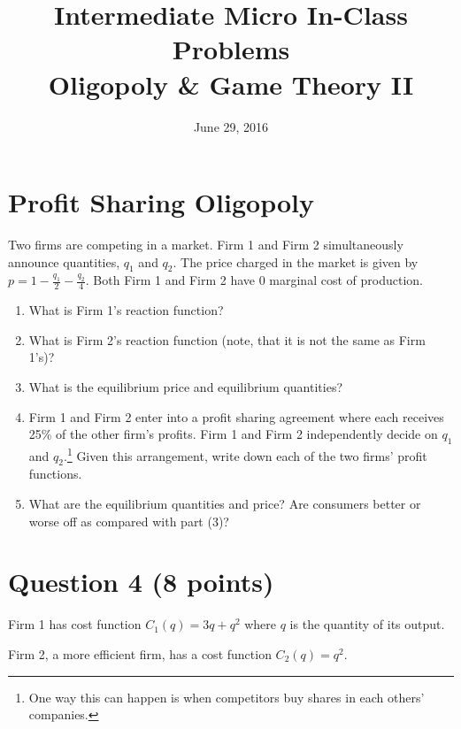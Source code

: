 \documentclass{article}
\begin{document}
\title{Intermediate Micro In-Class Problems \\ \large Oligopoly \& Game Theory II}

\date{June 29, 2016}

\maketitle

\section*{Profit Sharing Oligopoly}
Two firms are competing in a market. Firm 1 and Firm 2 simultaneously announce quantities, $q_{1}$ and $q_{2}$. The price charged in the market is given by $p = 1- \frac{q_{1}}{2} - \frac{q_{2}}{4}$. Both Firm 1 and Firm 2 have 0 marginal cost of production.

\begin{enumerate}
\item What is Firm 1's reaction function?
\item What is Firm 2's reaction function (note, that it is not the same as Firm 1's)?
\item What is the equilibrium price and equilibrium quantities?
\item Firm 1 and Firm 2 enter into a profit sharing agreement where each receives 25\% of the other firm's profits. Firm 1 and Firm 2 independently decide on $q_1$ and $q_2$.\footnote{One way this can happen is when competitors buy shares in each others' companies.} Given this arrangement, write down each of the two firms' profit functions.
\item What are the equilibrium quantities and price? Are consumers better or worse off as compared with part (3)?
\end{enumerate}

\section*{Question 4 (8 points)}
Firm 1 has cost function $C_1 (q) = 3 q + q^2$ where $q$ is the quantity of its output.

Firm 2, a more efficient firm, has a cost function $C_2 (q) = q^2$.
\end{document}
